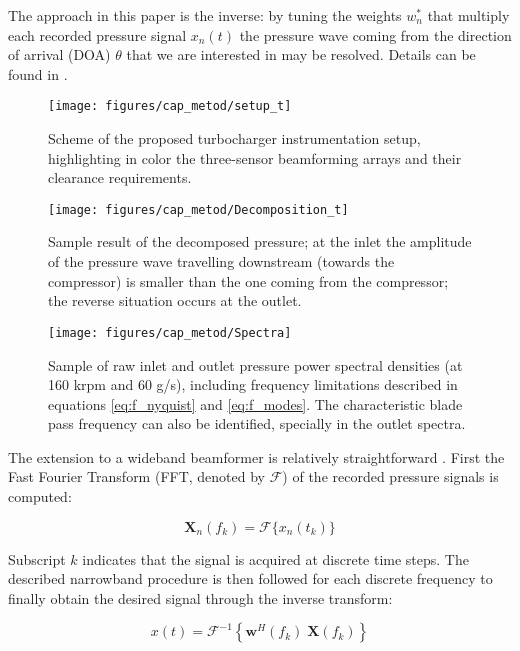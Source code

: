 The approach in this paper is the inverse: by tuning the weights $w_n^*$ that multiply each recorded pressure signal $x_n(t)$ the pressure wave coming from the direction of arrival (DOA) $\theta$ that we are interested in may be resolved. Details can be found in \cite{van1988beamforming}.

\begin{figure}[b!]
\centering
\texttt{[image: figures/cap\_metod/setup\_t]}
\caption{Scheme of the proposed turbocharger instrumentation setup, highlighting in color the three-sensor beamforming arrays and their clearance requirements.}
\label{fig:setup}
\end{figure}

\begin{figure*}[t!]
\centering
\texttt{[image: figures/cap\_metod/Decomposition\_t]}
\caption{Sample result of the decomposed pressure; at the inlet the amplitude of the pressure wave travelling downstream (towards the compressor) is smaller than the one coming from the compressor; the reverse situation occurs at the outlet.}
\label{fig:decomposition}
\end{figure*}

\begin{figure*}[t!]
\texttt{[image: figures/cap\_metod/Spectra]}
\caption{Sample of raw inlet and outlet pressure power spectral densities (at 160 krpm and 60 g/s), including frequency limitations described in equations \ref{eq:f_nyquist} and \ref{eq:f_modes}. The characteristic blade pass frequency can also be identified, specially in the outlet spectra.}
\label{fig:spectra}
\end{figure*}

The extension to a wideband beamformer is relatively straightforward \cite{piper2011broadband}. First the Fast Fourier Transform (FFT, denoted by $\mathcal F$) of the recorded pressure signals is computed:

\begin{equation}
  \mathbf X_n(f_k)=\mathcal{F}\{x_n(t_k)\}
\end{equation}

Subscript $k$ indicates that the signal is acquired at discrete time steps. The described narrowband procedure is then followed for each discrete frequency to finally obtain the desired signal through the inverse transform:

\begin{equation}
    x(t)=\mathcal{F}^{-1}\left\{\mathbf w^H(f_k)\; \mathbf X(f_k)\right\}
\end{equation}

